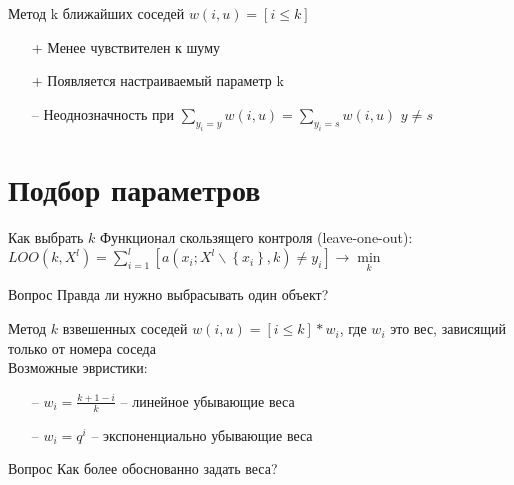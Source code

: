 \documentclass[10pt]{beamer}
\begin{document}
\begin{frame}{Метод k ближайших соседей}
	${w(i, u) = [i \leq k]}$\\
	\bigbreak
	\begin{itemize} [<+- | alert@+>]
		\item[+] Менее чувствителен к шуму
		\item[+] Появляется настраиваемый параметр k
	  \bigbreak
	  \item[--] Неоднозначность при ${\sum\limits_{y_i = y} w(i, u) = \sum\limits_{y_i = s} w(i, u)}$ \hspace{5mm} $y \neq s$
	\end{itemize}
\end{frame}

\section{Подбор параметров}

\begin{frame}{Как выбрать $k$}
	Функционал скользящего контроля (leave-one-out):\\
	\bigbreak
	${LOO(k, X^l) = \sum\limits_{i=1}^l [a(x_i; X^l \backslash \left\{x_i\right\}, k) \neq y_i] \rightarrow \min\limits_k}$\\
\end{frame}

\begin{frame}{Вопрос}
	Правда ли нужно выбрасывать один объект?
\end{frame}

\begin{frame}{Метод $k$ взвешенных соседей}
	${w(i,u) = [i \leq k] * w_i}$, где $w_i$ это вес, зависящий только от номера соседа\\
	\bigbreak
	Возможные эвристики:\\
	\begin{itemize} [<+- | alert@+>]
	\item[--] ${w_i = \frac{k+1-i}{k}}$ -- линейное убывающие веса\\ %
	\item[--] ${w_i = q^i}$ -- экспоненциально убывающие веса\\
	\end{itemize}
\end{frame}

\begin{frame}{Вопрос}
	\centering
	Как более обоснованно задать веса?\\
\end{frame}
\end{document}
